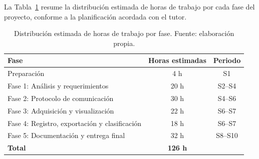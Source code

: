 \documentclass[11pt,a4paper,spanish]{book}
\begin{document}
La Tabla~\ref{tab:horas-fase} resume la distribuci\'{o}n estimada de horas de trabajo por cada fase del proyecto, conforme a la planificaci\'{o}n acordada con el tutor.

\begin{table}[ht]
\centering
\begin{tabular}{l c c}
\hline\hline
Fase & Horas estimadas & Periodo \\ [0.5ex]
\hline
Preparaci\'{o}n & 4 h & S1 \\
Fase 1: An\'{a}lisis y requerimientos & 20 h & S2--S4 \\
Fase 2: Protocolo de comunicaci\'{o}n & 30 h & S4--S6 \\
Fase 3: Adquisici\'{o}n y visualizaci\'{o}n & 22 h & S6--S7 \\
Fase 4: Registro, exportaci\'{o}n y clasificaci\'{o}n & 18 h & S6--S7 \\
Fase 5: Documentaci\'{o}n y entrega final & 32 h & S8--S10 \\
\hline
\textbf{Total} & \textbf{126 h} & \\ \hline
\end{tabular}
\caption[Horas por fase]{Distribuci\'{o}n estimada de horas de trabajo por fase. Fuente: elaboraci\'{o}n propia.}
\label{tab:horas-fase}
\end{table}
\end{document}
